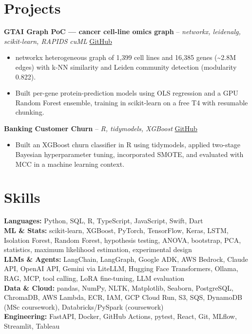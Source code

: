 \documentclass[a4paper,10pt]{article}
\begin{document}
\section{Projects}
\noindent\textbf{GTAI Graph PoC — cancer cell-line omics graph} -- \textit{networkx, leidenalg, scikit-learn, RAPIDS cuML} \hfill \href{https://github.com/Thiruvel-AP/GTAI-GraphPOC}{GitHub}
\begin{itemize}
  \item networkx heterogeneous graph of 1,399 cell lines and 16,385 genes (\textasciitilde{}2.8M edges) with k-NN similarity and Leiden community detection (modularity 0.822).
  \item Built per-gene protein-prediction models using OLS regression and a GPU Random Forest ensemble, training in scikit-learn on a free T4 with resumable chunking.
\end{itemize}
\noindent\textbf{Banking Customer Churn} -- \textit{R, tidymodels, XGBoost} \hfill \href{https://github.com/Thiruvel-AP/Banking-Customer-Churn-Prediction}{GitHub}
\begin{itemize}
  \item Built an XGBoost churn classifier in R using tidymodels, applied two-stage Bayesian hyperparameter tuning, incorporated SMOTE, and evaluated with MCC in a machine learning context.
\end{itemize}

\section{Skills}
\textbf{Languages:} Python, SQL, R, TypeScript, JavaScript, Swift, Dart\\
\textbf{ML \& Stats:} scikit-learn, XGBoost, PyTorch, TensorFlow, Keras, LSTM, Isolation Forest, Random Forest, hypothesis testing, ANOVA, bootstrap, PCA, statistics, maximum likelihood estimation, experimental design\\
\textbf{LLMs \& Agents:} LangChain, LangGraph, Google ADK, AWS Bedrock, Claude API, OpenAI API, Gemini via LiteLLM, Hugging Face Transformers, Ollama, RAG, MCP, tool calling, LoRA fine-tuning, LLM evaluation\\
\textbf{Data \& Cloud:} pandas, NumPy, NLTK, Matplotlib, Seaborn, PostgreSQL, ChromaDB, AWS Lambda, ECR, IAM, GCP Cloud Run, S3, SQS, DynamoDB (MSc coursework), Databricks/PySpark (coursework)\\
\textbf{Engineering:} FastAPI, Docker, GitHub Actions, pytest, React, Git, MLflow, Streamlit, Tableau
\end{document}
